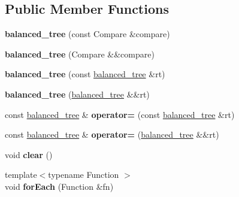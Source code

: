 \subsection*{Public Member Functions}
\begin{DoxyCompactItemize}
\item 
\hypertarget{classbalanced__tree_a7189ab79603a8eba14c8a270859bab4e}{{\bfseries balanced\+\_\+tree} (const Compare \&compare)}\label{classbalanced__tree_a7189ab79603a8eba14c8a270859bab4e}

\item 
\hypertarget{classbalanced__tree_a9753d18c5537f50da164a6370b16d5b0}{{\bfseries balanced\+\_\+tree} (Compare \&\&compare)}\label{classbalanced__tree_a9753d18c5537f50da164a6370b16d5b0}

\item 
\hypertarget{classbalanced__tree_a36075778a1883341c606daf227c9e907}{{\bfseries balanced\+\_\+tree} (const \hyperlink{classbalanced__tree}{balanced\+\_\+tree} \&rt)}\label{classbalanced__tree_a36075778a1883341c606daf227c9e907}

\item 
\hypertarget{classbalanced__tree_a23dc188a7cb17803c55c317eb55bd9bc}{{\bfseries balanced\+\_\+tree} (\hyperlink{classbalanced__tree}{balanced\+\_\+tree} \&\&rt)}\label{classbalanced__tree_a23dc188a7cb17803c55c317eb55bd9bc}

\item 
\hypertarget{classbalanced__tree_a357a9872c51fb74d417a795f101a192c}{const \hyperlink{classbalanced__tree}{balanced\+\_\+tree} \& {\bfseries operator=} (const \hyperlink{classbalanced__tree}{balanced\+\_\+tree} \&rt)}\label{classbalanced__tree_a357a9872c51fb74d417a795f101a192c}

\item 
\hypertarget{classbalanced__tree_aafeb13e1986bf05646e5804eb2dbb62d}{const \hyperlink{classbalanced__tree}{balanced\+\_\+tree} \& {\bfseries operator=} (\hyperlink{classbalanced__tree}{balanced\+\_\+tree} \&\&rt)}\label{classbalanced__tree_aafeb13e1986bf05646e5804eb2dbb62d}

\item 
\hypertarget{classbalanced__tree_a9f839393cb3d61f5b525d7275c27ab4d}{void {\bfseries clear} ()}\label{classbalanced__tree_a9f839393cb3d61f5b525d7275c27ab4d}

\item 
\hypertarget{classbalanced__tree_a8455d3b06365c6054b81ac672f6d7117}{{\footnotesize template$<$typename Function $>$ }\\void {\bfseries for\+Each} (Function \&fn)}\label{classbalanced__tree_a8455d3b06365c6054b81ac672f6d7117}


\end{DoxyCompactItemize}
